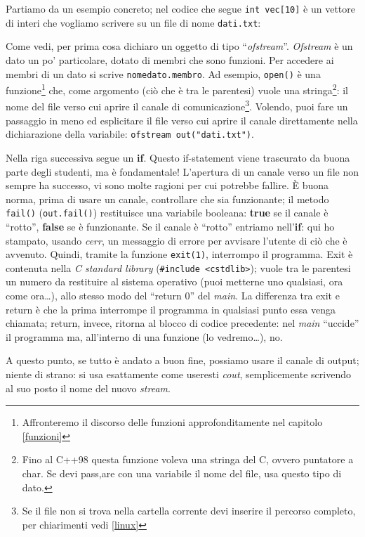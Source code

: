 Partiamo da un esempio concreto; nel codice che segue \lstinline|int vec[10]| è un vettore di interi che vogliamo scrivere su un file di nome \verb|dati.txt|:

\label{esout1}

Come vedi, per prima cosa dichiaro un oggetto di tipo ``\emph{ofstream}''. \emph{Ofstream} è un dato un po' particolare, dotato di membri che sono funzioni. Per accedere ai membri di un dato si scrive \verb|nomedato.membro|. Ad esempio, \verb|open()| è una funzione\footnote{Affronteremo il discorso delle funzioni approfonditamente nel capitolo \ref{funzioni}} che, come argomento (ciò che è tra le parentesi) vuole una stringa\footnote{Fino al C++98 questa funzione voleva una stringa del C, ovvero puntatore a char. Se devi pass,are con una variabile il nome del file, usa questo tipo di dato.}: il nome del file verso cui aprire il canale di comunicazione\footnote{Se il file non si trova nella cartella corrente devi inserire il percorso completo, per chiarimenti vedi \ref{linux}}. Volendo, puoi fare un passaggio in meno ed esplicitare il file verso cui aprire il canale direttamente nella dichiarazione della variabile: \lstinline|ofstream out("dati.txt")|. 

Nella riga successiva segue un \textbf{if}. Questo if-statement viene trascurato da buona parte degli studenti, ma è fondamentale! L'apertura di un canale verso un file non sempre ha successo, vi sono molte ragioni per cui potrebbe fallire. È buona norma, prima di usare un canale, controllare che sia funzionante; il metodo \verb|fail()| (\lstinline|out.fail()|) restituisce una variabile booleana: \textbf{true} se il canale è ``rotto'', \textbf{false} se è funzionante. Se il canale è ``rotto'' entriamo nell'\textbf{if}: qui ho stampato, usando \emph{cerr}, un messaggio di errore per avvisare l'utente di ciò che è avvenuto. Quindi, tramite la funzione \verb|exit(1)|, interrompo il programma. Exit è contenuta nella \emph{C standard library} (\lstinline|#include <cstdlib>|); vuole tra le parentesi un numero da restituire al sistema operativo (puoi metterne uno qualsiasi, ora come ora\ldots), allo stesso modo del ``return 0'' del \emph{main}. La differenza tra exit e return è che la prima interrompe il programma in qualsiasi punto essa venga chiamata; return, invece, ritorna al blocco di codice precedente: nel \emph{main} ``uccide'' il programma ma, all'interno di una funzione (lo vedremo\ldots), no.

A questo punto, se tutto è andato a buon fine, possiamo usare il canale di output; niente di strano: si usa esattamente come useresti \emph{cout}, semplicemente scrivendo al suo posto il nome del nuovo \emph{stream}. 

